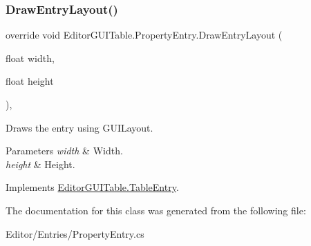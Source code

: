 \subsubsection{\texorpdfstring{Draw\+Entry\+Layout()}{DrawEntryLayout()}}
{\footnotesize\ttfamily override void Editor\+G\+U\+I\+Table.\+Property\+Entry.\+Draw\+Entry\+Layout (\begin{DoxyParamCaption}\item[{float}]{width,  }\item[{float}]{height }\end{DoxyParamCaption})\hspace{0.3cm}{\ttfamily [inline]}, {\ttfamily [virtual]}}



Draws the entry using G\+U\+I\+Layout. 


\begin{DoxyParams}{Parameters}
{\em width} & Width.\\
\hline
{\em height} & Height.\\
\hline
\end{DoxyParams}


Implements \mbox{\hyperlink{class_editor_g_u_i_table_1_1_table_entry_abe1e2747e56d50731eeec28635b366a1}{Editor\+G\+U\+I\+Table.\+Table\+Entry}}.



The documentation for this class was generated from the following file\+:\begin{DoxyCompactItemize}
\item 
Editor/\+Entries/Property\+Entry.\+cs\end{DoxyCompactItemize}
